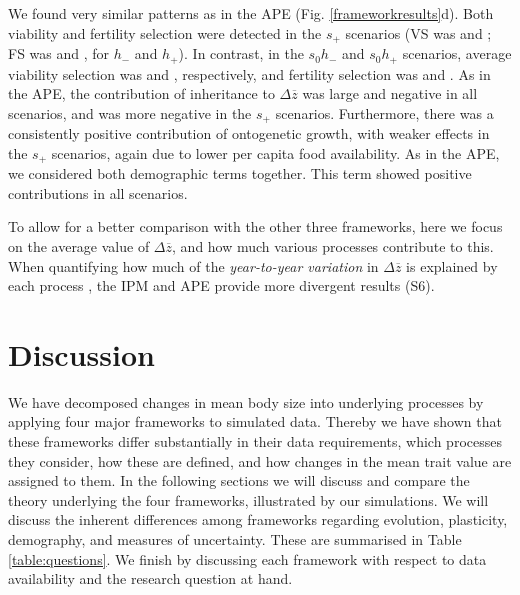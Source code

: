 We found very similar patterns as in the APE (Fig. \ref{frameworkresults}d). Both viability and fertility selection were detected in the $s_+$ scenarios (VS was  and ; FS was  and , for $h_{-}$ and $h_+$). In contrast, in the $s_0 h_-$ and $s_0 h_+$ scenarios, average viability selection was  and , respectively, and fertility selection was  and .  As in the APE, the contribution of inheritance to $\Delta \overline z$ was large and negative in all scenarios, and was more negative in the $s_+$ scenarios. Furthermore, there was a consistently positive contribution of ontogenetic growth, with weaker effects in the $s_+$ scenarios, again due to lower per capita food availability. As in the APE, we considered both demographic terms together. This term showed positive contributions in all scenarios.

To allow for a better comparison with the other three frameworks, here we focus on the average value of $\Delta \overline z$, and how much various processes contribute to this. When quantifying how much of the \emph{year-to-year variation} in $\Delta \overline z$ is explained by each process \parencite[as for example in][]{Ozgul2009}, the IPM and APE provide more divergent results (S6).


\section{Discussion}
We have decomposed changes in mean body size into underlying processes by applying four major  frameworks to simulated data. Thereby we have shown that these frameworks differ substantially in their data requirements, which processes they consider, how these are defined, and how changes in the mean trait value are assigned to them. In the following sections we will discuss and compare the theory underlying the four frameworks, illustrated by our simulations. We will discuss the inherent differences among frameworks regarding evolution, plasticity, demography, and measures of uncertainty. These are summarised in Table \ref{table:questions}. We finish by discussing each framework with respect to data availability and the research question at hand.


